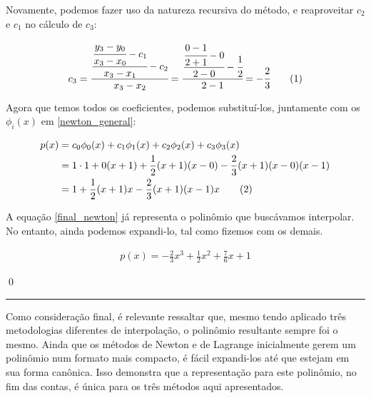 \documentclass[9.5pt,reqno,a4paper]{amsart}
\newcommand\numberthis{\addtocounter{equation}{1}\tag{\theequation}}
\begin{document}
\bigskip
\bigskip
Novamente, podemos fazer uso da natureza recursiva do método, e reaproveitar $c_2$ e $c_1$ no cálculo de $c_3$:

\begin{align*}
    c_3 = \cfrac{\cfrac{\cfrac{y_3 - y_0}{x_3 - x_0} - c_1}{x_3 - x_1} - c_2}{x_3 - x_2}
        = \cfrac{\cfrac{\cfrac{0 - 1}{2 + 1} - 0}{2 - 0} - \cfrac{1}{2}}{2 - 1}
        = -\cfrac{2}{3} \numberthis \label{c_3}
\end{align*}

\bigskip
\bigskip
Agora que temos todos os coeficientes, podemos substituí-los, juntamente com os $\phi_i(x)$ em \eqref{newton_general}:

\begin{align*}
    p(x) &= c_0\phi_0(x) + c_1\phi_1(x) + c_2\phi_2(x) + c_3\phi_3(x) \\
         &= 1 \cdot 1 + 0(x+1) + \frac{1}{2}(x+1)(x-0) - \frac{2}{3}(x+1)(x-0)(x-1) \\
         &= 1 + \frac{1}{2}(x+1)x - \frac{2}{3}(x+1)(x-1)x \numberthis \label{final_newton}
\end{align*}

\bigskip
\bigskip
A equação \eqref{final_newton} já representa o polinômio que buscávamos interpolar. No entanto, ainda podemos expandi-lo, tal como fizemos com os demais.

\begin{align*}
    p(x) = -\frac{2}{3}x^3 + \frac{1}{2}x^2 + \frac{7}{6}x + 1
\end{align*}

\qed\null

\bigskip
\bigskip
\noindent\rule{\textwidth}{0.4pt}
Como consideração final, é relevante ressaltar que, mesmo tendo aplicado três metodologias diferentes de interpolação, o polinômio resultante sempre foi o mesmo. Ainda que os métodos de Newton e de Lagrange inicialmente gerem um polinômio num formato mais compacto, é fácil expandi-los até que estejam em sua forma canônica. Isso demonstra que a representação para este polinômio, no fim das contas, é única para os três métodos aqui apresentados.
\end{document}
